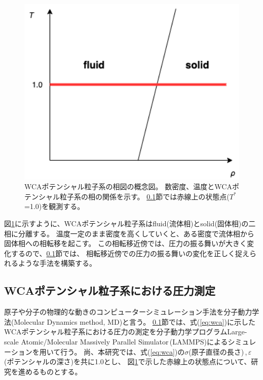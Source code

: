 \documentclass[titlepage]{jsreport}
\begin{document}
{{{\begin{figure}[htbp]
    \begin{center}
        \includegraphics[width=12cm]{fig/wca-phase-diagram.png}
    \end{center}
    \caption{WCAポテンシャル粒子系の相図の概念図。
    数密度、温度とWCAポテンシャル粒子系の相の関係を示す。
    \ref{method-subsec:WCA-pressure}節では赤線上の状態点($T^*$=1.0)を観測する。}
    
    \label{fig:wca-phase-diagram}
\end{figure}

\newpage
図\ref{fig:wca-phase-diagram}に示すように、WCAポテンシャル粒子系はfluid(流体相)とsolid(固体相)の二相に分離する。
温度一定のまま密度を高くしていくと、ある密度で流体相から固体相への相転移を起こす。
この相転移近傍では、圧力の振る舞いが大きく変化するので、\ref{method-subsec:WCA-pressure}節では、
相転移近傍での圧力の振る舞いの変化を正しく捉えられるような手法を構築する。


\subsection{WCAポテンシャル粒子系における圧力測定}\label{method-subsec:WCA-pressure}
原子や分子の物理的な動きのコンピューターシミュレーション手法を分子動力学法(Molecular Dynamics method, MD)と言う\cite{molecular-dynamics}。
\ref{method-subsec:WCA-pressure}節では、式(\ref{eq:wca})に示したWCAポテンシャル粒子系における圧力の測定を分子動力学プログラムLarge-scale Atomic/Molecular Massively Parallel Simulator\,(LAMMPS)\cite{lammps}によるシミュレーションを用いて行う。
尚、本研究では、式(\ref{eq:wca})の${\sigma}$(原子直径の長さ)\,,\,${\varepsilon}$(ポテンシャルの深さ)を共に1.0とし、
図\ref{fig:wca-phase-diagram}で示した赤線上の状態点について、研究を進めるものとする。


}}}
\end{document}
